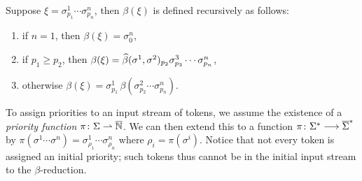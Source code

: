 \documentclass{llncs}
\begin{document}
Suppose $\xi=\sigma^1_{p_1}\cdots\sigma^n_{p_n}$, then $\beta(\xi)$ is defined recursively as follows:
\begin{enumerate}
    \item if $n=1$, then $\beta(\xi)=\sigma^n_0$,
    \item if $p_1\geq p_2$, then $\beta(\xi)=\widehat\beta(\sigma^1,\sigma^2)_{p_2}\sigma^3_{p_3}\cdots\sigma^n_{p_n}$,
    \item otherwise $\beta(\xi)=\sigma^1_{p_1}\,\beta(\sigma^2_{p_2}\cdots\sigma^n_{p_n})$.
\end{enumerate}

To assign priorities to an input stream of tokens, we assume the existence of a \textit{priority function} $\pi\colon\Sigma\rightharpoonup\overline{\mathbb N}$.
We can then extend this to a function $\pi\colon\Sigma^*\longrightarrow\overline\Sigma^*$ by $\pi(\sigma^1\cdots\sigma^n)=\sigma^1_{\rho_1}\cdots\sigma^n_{\rho_n}$ where $\rho_i=\pi(\sigma^i)$.
Notice that not every token is assigned an initial priority; such tokens thus cannot be in the initial input stream to the $\beta$-reduction.

\end{document}

